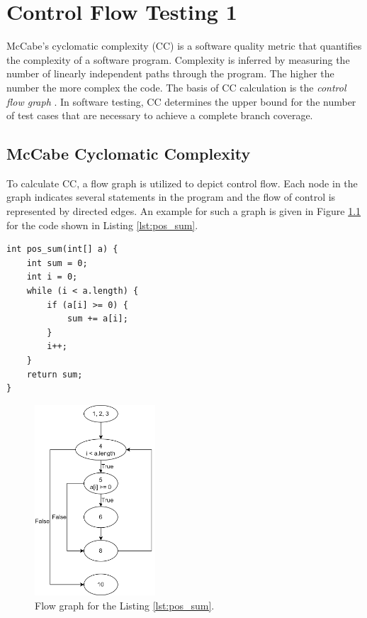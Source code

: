 \chapter{Control Flow Testing 1}
McCabe's cyclomatic complexity (CC) is a software quality metric that quantifies the complexity of a software program. Complexity is inferred by measuring the number of linearly independent paths through the program. The higher the number the more complex the code. The basis of CC calculation is the \emph{control flow graph} \autocite{spillner2021software}. In software testing, CC determines the upper bound for the number of test cases that are necessary to achieve a complete branch coverage.

\section{McCabe Cyclomatic Complexity}
To calculate CC, a flow graph is utilized to depict control flow. Each node in the graph indicates several statements in the program and the flow of control is represented by directed edges. An example for such a graph is given in Figure \ref{fig:flow-graph-eg} for the code shown in Listing \ref{lst:pos_sum}.

\begin{lstlisting}[caption={pos\_sum finds the sum of all positive numbers stored in an integer array a. Input parameter is a, an array of integers. The output of the function is sum, the sum of integers inside the array a.},label=lst:pos_sum]
int pos_sum(int[] a) {
    int sum = 0;
    int i = 0;
    while (i < a.length) {
        if (a[i] >= 0) {
            sum += a[i];
        }
        i++;
    }
    return sum;
}
\end{lstlisting}

\begin{figure}[H]
    \centering
    \includegraphics[width=0.4\textwidth]{images/flow-graph-eg.png}
    \caption{Flow graph for the Listing \ref{lst:pos_sum}.}
    \label{fig:flow-graph-eg}
\end{figure}

